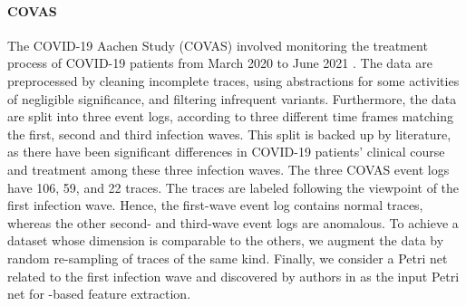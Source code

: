 \paragraph{COVAS}
The COVID-19 Aachen Study (COVAS) involved monitoring the treatment process of COVID-19 patients from March 2020 to June 2021 \cite{pegoraro2021covas,benevento2022covas}. The data are preprocessed by cleaning incomplete traces, using abstractions for some activities of negligible significance, and filtering infrequent variants. Furthermore, the data are split into three event logs, according to three different time frames matching the first, second and third infection waves. This split is backed up by literature, as there have been significant differences in COVID-19 patients' clinical course and treatment among these three infection waves. The three COVAS event logs have 106, 59, and 22 traces. The traces are labeled following the viewpoint of the first infection wave. Hence, the first-wave event log contains normal traces, whereas the other second- and third-wave event logs are anomalous. To achieve a dataset whose dimension is comparable to the others, we augment the data by random re-sampling of traces of the same kind. Finally, we consider a Petri net related to the first infection wave and discovered by authors in \cite{benevento2022covas} as the input Petri net for  -based feature extraction.

